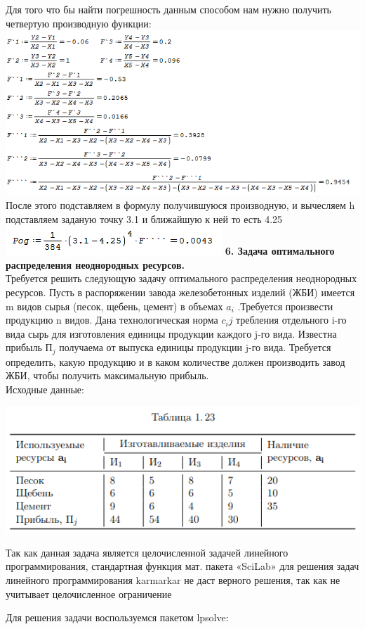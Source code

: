 \documentclass[russian,utf8,nocolumnxxxi,nocolumnxxxii]{eskdtext}
\begin{document}
{\begin{center}
\end{center}
Для того что бы найти погрешность данным способом нам нужно получить четвертую производную функции:
\\\includegraphics[scale=0.7]{2019-01-11_01-54-43}
\\После этого подставляем в формулу получившуюся производную, и вычесляем h подставляем заданую точку 3.1 и ближайшую к ней то есть 4.25
\\\includegraphics[scale=0.7]{2019-01-11_01-58-44}
\newpage
{\bf6. Задача оптимального распределения неоднородных ресурсов.}\\
Требуется решить следующую задачу оптимального распределения неоднородных ресурсов. Пусть в распоряжении завода железобетонных изделий (ЖБИ) имеется m видов сырья (песок, щебень, цемент) в объемах $ a_i$  .Требуется произвести продукцию n видов. Дана технологическая норма $c_ij$  требления отдельного i-го вида сырь для изготовления единицы продукции каждого j-го вида. Известна прибыль $П_j$  получаема от выпуска единицы продукции j-го вида. Требуется определить, какую продукцию и в каком количестве должен производить завод ЖБИ, чтобы получить максимальную прибыль.\\
Исходные данные:\\

\begin{center}
\includegraphics[scale=0.7]{2019-01-09_01-47-19}
\end{center}
Так как данная задача является целочисленной задачей линейного программирования, стандартная функция мат. пакета «SciLab» для решения задач линейного программирования karmarkar не даст верного решения, так как не учитывает целочисленное ограничение
\newpage
\par
\normalsize
Для решения задачи воспользуемся пакетом lpsolve:

}
\end{document}
